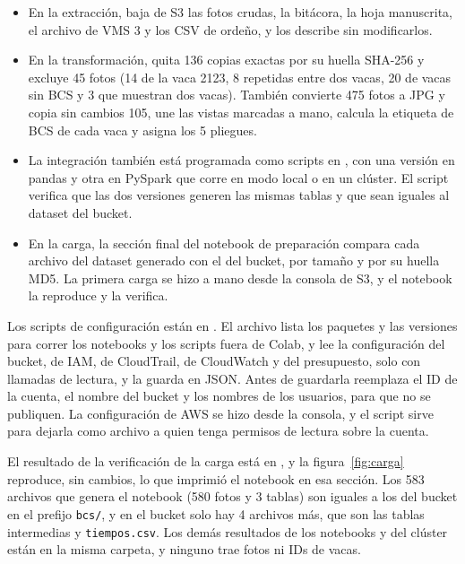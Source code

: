 \documentclass[11pt,letterpaper,DIV=12]{scrartcl}
\begin{document}
\begin{itemize}
  \item En la extracción,  baja de S3 las fotos crudas, la bitácora, la hoja manuscrita, el archivo de VMS 3 y los CSV de ordeño, y los describe sin modificarlos.
  \item En la transformación,  quita 136 copias exactas por su huella SHA-256 y excluye 45 fotos (14 de la vaca 2123, 8 repetidas entre dos vacas, 20 de vacas sin BCS y 3 que muestran dos vacas). También convierte 475 fotos a JPG y copia sin cambios 105, une las vistas marcadas a mano, calcula la etiqueta de BCS de cada vaca y asigna los 5 pliegues.
  \item La integración también está programada como scripts en , con una versión en pandas y otra en PySpark que corre en modo local o en un clúster. El script  verifica que las dos versiones generen las mismas tablas y que sean iguales al dataset del bucket.
  \item En la carga, la sección final del notebook de preparación compara cada archivo del dataset generado con el del bucket, por tamaño y por su huella MD5. La primera carga se hizo a mano desde la consola de S3, y el notebook la reproduce y la verifica.
\end{itemize}

Los scripts de configuración están en . El archivo  lista los paquetes y las versiones para correr los notebooks y los scripts fuera de Colab, y  lee la configuración del bucket, de IAM, de CloudTrail, de CloudWatch y del presupuesto, solo con llamadas de lectura, y la guarda en JSON. Antes de guardarla reemplaza el ID de la cuenta, el nombre del bucket y los nombres de los usuarios, para que no se publiquen. La configuración de AWS se hizo desde la consola, y el script sirve para dejarla como archivo a quien tenga permisos de lectura sobre la cuenta.

El resultado de la verificación de la carga está en , y la figura~\ref{fig:carga} reproduce, sin cambios, lo que imprimió el notebook en esa sección. Los 583 archivos que genera el notebook (580 fotos y 3 tablas) son iguales a los del bucket en el prefijo \nolinkurl{bcs/}, y en el bucket solo hay 4 archivos más, que son las tablas intermedias y \nolinkurl{tiempos.csv}. Los demás resultados de los notebooks y del clúster están en la misma carpeta, y ninguno trae fotos ni IDs de vacas.
\end{document}
